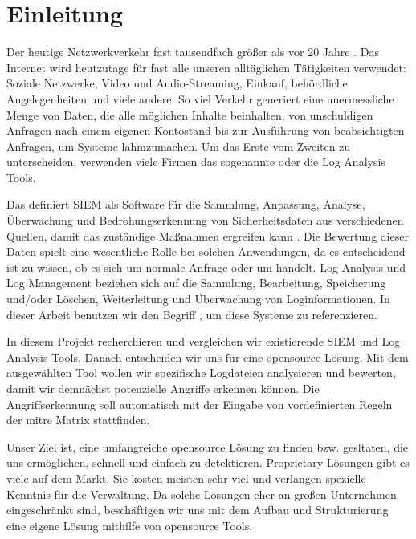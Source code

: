 \section{Einleitung}

Der heutige Netzwerkverkehr fast tausendfach größer als vor 20 Jahre \citep{Roser_I}. Das Internet wird heutzutage für fast alle unseren alltäglichen Tätigkeiten verwendet: Soziale Netzwerke, Video und Audio-Streaming, Einkauf, behördliche Angelegenheiten und viele andere. So viel Verkehr generiert eine unermessliche Menge von Daten, die alle möglichen Inhalte beinhalten, von unschuldigen Anfragen nach einem eigenen Kontostand bis zur Ausführung von beabsichtigten Anfragen, um Systeme lahmzumachen. Um das Erste vom Zweiten zu unterscheiden, verwenden viele Firmen das sogenannte  oder die Log Analysis Tools. 

Das  definiert \gls{SIEM} als Software für die Sammlung, Anpassung, Analyse, Überwachung und Bedrohungserkennung von Sicherheitsdaten aus verschiedenen Quellen, damit das zuständige   Maßnahmen ergreifen kann \citep{NIST_Definitions}. Die Bewertung dieser Daten spielt eine wesentliche Rolle bei solchen Anwendungen, da es entscheidend ist zu wissen, ob es sich um normale Anfrage oder um  handelt. Log Analysis und Log Management beziehen sich auf die Sammlung, Bearbeitung, Speicherung und/oder Löschen, Weiterleitung und Überwachung von Loginformationen. In dieser Arbeit benutzen wir den Begriff , um diese Systeme zu referenzieren.

In diesem Projekt recherchieren und vergleichen wir existierende \gls{SIEM} und Log Analysis Tools. Danach entscheiden wir uns für eine \gls{opensource} Lösung. Mit dem ausgewählten Tool wollen wir spezifische Logdateien analysieren und bewerten, damit wir demnächst potenzielle Angriffe erkennen können. Die Angriffserkennung soll automatisch mit der Eingabe von vordefinierten Regeln der \gls{mitre} Matrix stattfinden. 

\newpage
Unser Ziel ist, eine umfangreiche \gls{opensource} Lösung zu finden bzw. gesltaten, die uns ermöglichen,  schnell und einfach zu detektieren. \gls{Proprietary} Lösungen gibt es viele auf dem Markt. Sie kosten meisten sehr viel und verlangen spezielle Kenntnis für die Verwaltung. Da solche Lösungen eher an großen Unternehmen eingeschränkt sind, beschäftigen wir uns mit dem Aufbau und Strukturierung eine eigene Lösung mithilfe von \gls{opensource} Tools. 


